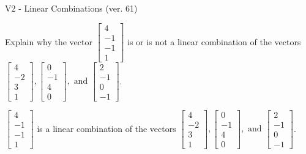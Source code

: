 \begin{exercise}
  \begin{exerciseTitle}V2 - Linear Combinations (ver. 61)\end{exerciseTitle}
  \begin{exerciseStatement}
    Explain why the vector \(\left[\begin{array}{c}
4 \\
-1 \\
-1 \\
1
\end{array}\right]\)  is or is not a linear 
	combination of the vectors \(\left[\begin{array}{c}
4 \\
-2 \\
3 \\
1
\end{array}\right] , \left[\begin{array}{c}
0 \\
-1 \\
4 \\
0
\end{array}\right] , \text{ and } \left[\begin{array}{c}
2 \\
-1 \\
0 \\
-1
\end{array}\right]\).
	


  \end{exerciseStatement}
  \begin{exerciseAnswer}
   \(\left[\begin{array}{c}
4 \\
-1 \\
-1 \\
1
\end{array}\right]\) 
  	 is  
	a linear combination of the vectors \(\left[\begin{array}{c}
4 \\
-2 \\
3 \\
1
\end{array}\right] , \left[\begin{array}{c}
0 \\
-1 \\
4 \\
0
\end{array}\right] , \text{ and } \left[\begin{array}{c}
2 \\
-1 \\
0 \\
-1
\end{array}\right]\).

	
  


  \end{exerciseAnswer}
\end{exercise}